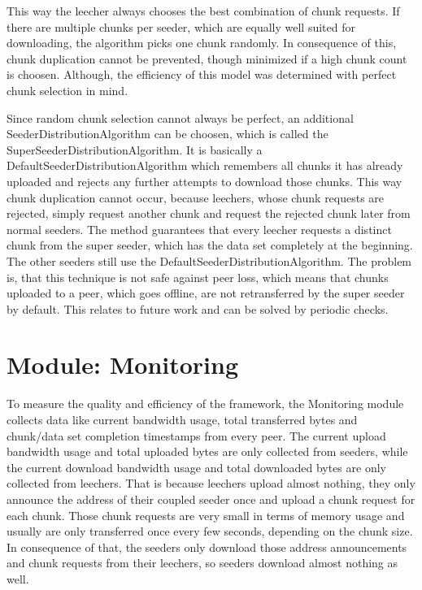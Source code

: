 This way the leecher always chooses the best combination of chunk requests. If there are multiple chunks per seeder, which are equally well suited for downloading, the algorithm picks one chunk randomly. In consequence of this, chunk duplication cannot be prevented, though minimized if a high chunk count is choosen. Although, the efficiency of this model was determined with perfect chunk selection in mind. 

Since random chunk selection cannot always be perfect, an additional SeederDistributionAlgorithm can be choosen, which is called the SuperSeederDistributionAlgorithm. It is basically a DefaultSeederDistributionAlgorithm which remembers all chunks it has already uploaded and rejects any further attempts to download those chunks. This way chunk duplication cannot occur, because leechers, whose chunk requests are rejected, simply request another chunk and request the rejected chunk later from normal seeders. The method guarantees that every leecher requests a distinct chunk from the super seeder, which has the data set completely at the beginning. The other seeders still use the DefaultSeederDistributionAlgorithm. The problem is, that this technique is not safe against peer loss, which means that chunks uploaded to a peer, which goes offline, are not retransferred by the super seeder by default. This relates to future work and can be solved by periodic checks.

\cleardoublepage
\section{Module: Monitoring}
\label{sec:monitoring}
To measure the quality and efficiency of the framework, the Monitoring module collects data like current bandwidth usage, total transferred bytes and chunk/data set completion timestamps from every peer. The current upload bandwidth usage and total uploaded bytes are only collected from seeders, while the current download bandwidth usage and total downloaded bytes are only collected from leechers. That is because leechers upload almost nothing, they only announce the address of their coupled seeder once and upload a chunk request for each chunk. Those chunk requests are very small in terms of memory usage and usually are only transferred once every few seconds, depending on the chunk size. In consequence of that, the seeders only download those address announcements and chunk requests from their leechers, so seeders download almost nothing as well.

